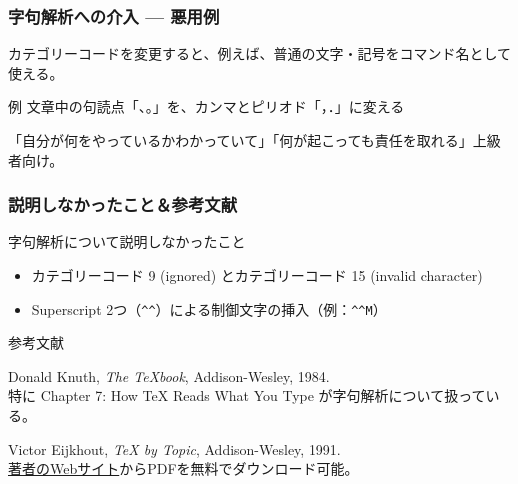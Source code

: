 \documentclass{beamer}
\begin{document}
\begin{frame}[fragile]\frametitle{字句解析への介入 --- 悪用例}
  カテゴリーコードを変更すると、例えば、普通の文字・記号をコマンド名として使える。

\begin{block}{例}
文章中の句読点「、。」を、カンマとピリオド「，．」に変える
\begin{quote}
\end{quote}
\end{block}

「自分が何をやっているかわかっていて」「何が起こっても責任を取れる」上級者向け。
\end{frame}

\begin{frame}[fragile]\frametitle{説明しなかったこと＆参考文献}
  \begin{block}{字句解析について説明しなかったこと}
    \begin{itemize}
    \item カテゴリーコード 9 (ignored) とカテゴリーコード 15 (invalid character)
    \item Superscript 2つ（\verb|^^|）による制御文字の挿入（例：\verb|^^M|）
    \end{itemize}
  \end{block}

  \begin{block}{参考文献}
    \begin{thebibliography}{9}
    \item Donald Knuth, \emph{The \TeX book}, Addison-Wesley, 1984. \\
      特に Chapter 7: How \TeX{} Reads What You Type が字句解析について扱っている。
    \item Victor Eijkhout, \emph{\TeX{} by Topic}, Addison-Wesley, 1991. \\
      \href{http://eijkhout.net/texbytopic/texbytopic.html}{著者のWebサイト}からPDFを無料でダウンロード可能。
    \end{thebibliography}
  \end{block}
\end{frame}
\end{document}
